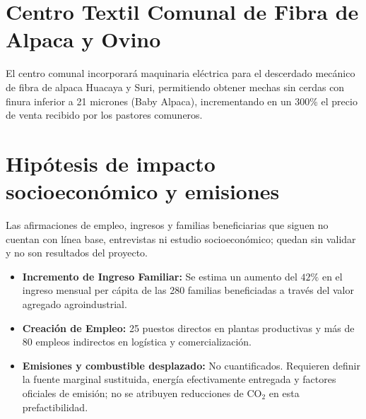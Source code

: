 \documentclass[11pt,a4paper]{report}
\begin{document}
\section{Centro Textil Comunal de Fibra de Alpaca y Ovino}
El centro comunal incorporará maquinaria eléctrica para el descerdado mecánico de fibra de alpaca Huacaya y Suri, permitiendo obtener mechas sin cerdas con finura inferior a 21 micrones (Baby Alpaca), incrementando en un 300\% el precio de venta recibido por los pastores comuneros.

\section{Hipótesis de impacto socioeconómico y emisiones}
Las afirmaciones de empleo, ingresos y familias beneficiarias que siguen no cuentan con línea base, entrevistas ni estudio socioeconómico; quedan sin validar y no son resultados del proyecto.
\begin{itemize}
    \item \textbf{Incremento de Ingreso Familiar:} Se estima un aumento del $42\%$ en el ingreso mensual per cápita de las 280 familias beneficiadas a través del valor agregado agroindustrial.
    \item \textbf{Creación de Empleo:} 25 puestos directos en plantas productivas y más de 80 empleos indirectos en logística y comercialización.
    \item \textbf{Emisiones y combustible desplazado:} No cuantificados. Requieren definir la fuente marginal sustituida, energía efectivamente entregada y factores oficiales de emisión; no se atribuyen reducciones de CO$_2$ en esta prefactibilidad.
\end{itemize}
\end{document}
